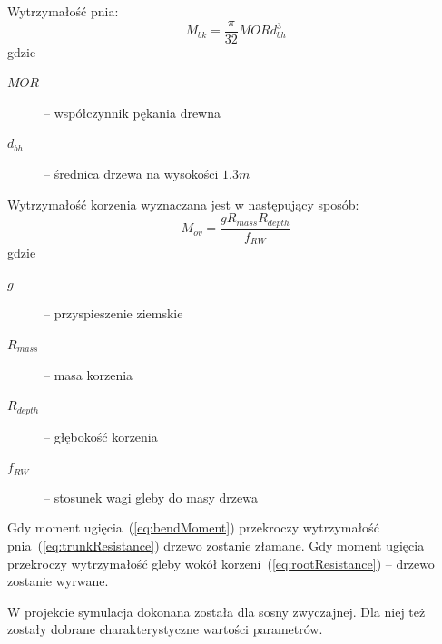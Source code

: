 Wytrzymałość pnia:
\begin{equation}
\label{eq:trunkResistance}
	M_{bk} = \frac{\pi}{32} MOR d^3_{bh}
\end{equation}
gdzie
\begin{description}
	\item[$MOR$] -- współczynnik pękania drewna
	\item[$d_{bh}$] -- średnica drzewa na wysokości $1.3m$
\end{description}

Wytrzymałość korzenia wyznaczana jest w następujący sposób:
\begin{equation}
\label{eq:rootResistance}
	M_{ov} = \frac{g R_{mass} R_{depth}}{f_{RW}}
\end{equation}
gdzie
\begin{description}
	\item[$g$] -- przyspieszenie ziemskie
	\item[$R_{mass}$] -- masa korzenia
	\item[$R_{depth}$] -- głębokość korzenia
	\item[$f_{RW}$] -- stosunek wagi gleby do masy drzewa
\end{description}

Gdy moment ugięcia~(\ref{eq:bendMoment}) przekroczy wytrzymałość pnia~(\ref{eq:trunkResistance}) drzewo zostanie złamane. Gdy moment ugięcia przekroczy wytrzymałość gleby wokół korzeni~(\ref{eq:rootResistance}) -- drzewo zostanie wyrwane.

W projekcie symulacja dokonana została dla sosny zwyczajnej. Dla niej też zostały dobrane charakterystyczne wartości parametrów.


